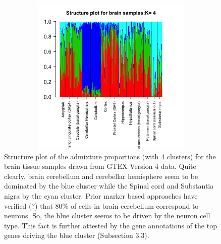 \begin{figure}[ht]
\centering
  \includegraphics[height=3in, width=4.5in]{../plots/brain_structure_plot.png}
    \caption{Structure plot of the admixture proportions (with 4 clusters) for the brain tissue samples drawn from GTEX Version 4 data. Quite clearly, brain cerebellum and cerebellar hemisphere seem to be dominated by the blue cluster while the Spinal cord and Substantia nigra by the cyan cluster. Prior marker based approaches have verified (?) that $80 \%$ of cells in brain cerebellum correspond to neurons. So, the blue cluster seems to be driven by the neuron cell type. This fact is further attested by the gene annotations of the top genes driving the blue cluster (Subsection 3.3).}
\end{figure}

